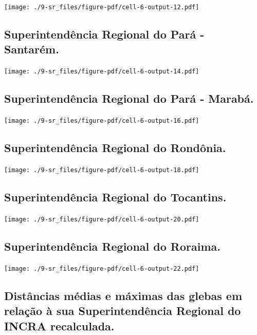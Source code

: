 \documentclass[
  letterpaper,
]{report}
\begin{document}
\texttt{[image: ./9-sr\_files/figure-pdf/cell-6-output-12.pdf]}

\hypertarget{superintenduxeancia-regional-do-paruxe1---santaruxe9m.-1}{%
\subsection{Superintendência Regional do Pará -
Santarém.}\label{superintenduxeancia-regional-do-paruxe1---santaruxe9m.-1}}

\texttt{[image: ./9-sr\_files/figure-pdf/cell-6-output-14.pdf]}

\hypertarget{superintenduxeancia-regional-do-paruxe1---marabuxe1.-1}{%
\subsection{Superintendência Regional do Pará -
Marabá.}\label{superintenduxeancia-regional-do-paruxe1---marabuxe1.-1}}

\texttt{[image: ./9-sr\_files/figure-pdf/cell-6-output-16.pdf]}

\hypertarget{superintenduxeancia-regional-do-ronduxf4nia.-1}{%
\subsection{Superintendência Regional do
Rondônia.}\label{superintenduxeancia-regional-do-ronduxf4nia.-1}}

\texttt{[image: ./9-sr\_files/figure-pdf/cell-6-output-18.pdf]}

\hypertarget{superintenduxeancia-regional-do-tocantins.-1}{%
\subsection{Superintendência Regional do
Tocantins.}\label{superintenduxeancia-regional-do-tocantins.-1}}

\texttt{[image: ./9-sr\_files/figure-pdf/cell-6-output-20.pdf]}

\hypertarget{superintenduxeancia-regional-do-roraima.-1}{%
\subsection{Superintendência Regional do
Roraima.}\label{superintenduxeancia-regional-do-roraima.-1}}

\texttt{[image: ./9-sr\_files/figure-pdf/cell-6-output-22.pdf]}

\hypertarget{distuxe2ncias-muxe9dias-e-muxe1ximas-das-glebas-em-relauxe7uxe3o-uxe0-sua-superintenduxeancia-regional-do-incra-recalculada.}{%
\subsection{Distâncias médias e máximas das glebas em relação à sua
Superintendência Regional do INCRA
recalculada.}\label{distuxe2ncias-muxe9dias-e-muxe1ximas-das-glebas-em-relauxe7uxe3o-uxe0-sua-superintenduxeancia-regional-do-incra-recalculada.}}
\end{document}
